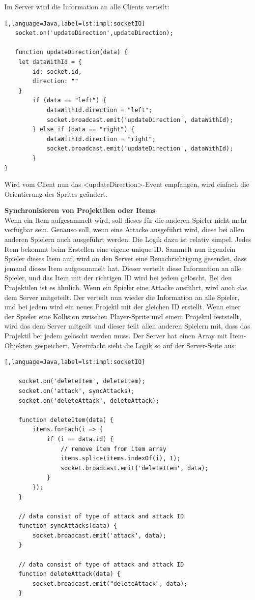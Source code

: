 Im Server wird die Information an alle Clients verteilt:

\begin{lstlisting}[,language=Java,label=lst:impl:socketIO]
   socket.on('updateDirection',updateDirection);

   function updateDirection(data) {
    let dataWithId = {
        id: socket.id,
        direction: ""
    }
        if (data == "left") {
            dataWithId.direction = "left";
            socket.broadcast.emit('updateDirection', dataWithId);
        } else if (data == "right") {
            dataWithId.direction = "right";
            socket.broadcast.emit('updateDirection', dataWithId);
        }
}
\end{lstlisting}

Wird vom Client nun das <updateDirection>-Event empfangen, wird einfach die Orientierung des Sprites geändert.

\textbf{Synchronisieren von Projektilen oder Items} \\
Wenn ein Item aufgesammelt wird, soll dieses für die anderen Spieler nicht mehr verfügbar sein. Genauso soll, wenn eine Attacke ausgeführt wird, diese bei allen anderen Spielern auch ausgeführt werden.
Die Logik dazu ist relativ simpel. Jedes Item bekommt beim Erstellen eine eigene unique ID. Sammelt nun irgendein Spieler dieses Item auf, wird an den Server eine Benachrichtigung gesendet, dass jemand dieses Item aufgesammelt hat.
Dieser verteilt diese Information an alle Spieler, und das Item mit der richtigen ID wird bei jedem gelöscht.
Bei den Projektilen ist es ähnlich. Wenn ein Spieler eine Attacke ausführt, wird auch das dem Server mitgeteilt. Der verteilt nun wieder die Information an alle Spieler, und bei jedem wird ein neues Projekil mit der gleichen ID erstellt.
Wenn einer der Spieler eine Kollision zwischen Player-Sprite und einem Projektil feststellt, wird das dem Server mitgeilt und dieser teilt allen anderen Spielern mit, dass das Projektil bei jedem gelöscht werden muss.
Der Server hat einen Array mit Item-Objekten gespeichert. Vereinfacht sieht die Logik so auf der Server-Seite aus:

\begin{lstlisting}[,language=Java,label=lst:impl:socketIO]

    socket.on('deleteItem', deleteItem);
    socket.on('attack', syncAttacks);
    socket.on('deleteAttack', deleteAttack);

    function deleteItem(data) {
        items.forEach(i => {
            if (i == data.id) {
                // remove item from item array
                items.splice(items.indexOf(i), 1);
                socket.broadcast.emit('deleteItem', data);
            }
        });
    }

    // data consist of type of attack and attack ID
    function syncAttacks(data) {
        socket.broadcast.emit('attack', data);
    }

    // data consist of type of attack and attack ID
    function deleteAttack(data) {
        socket.broadcast.emit("deleteAttack", data);
    }

 \end{lstlisting}

